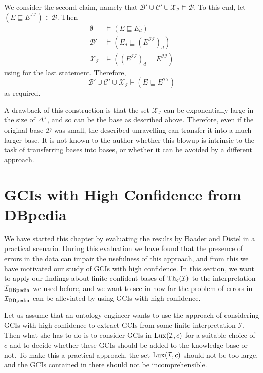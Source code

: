 \begin{Proof}
  We consider the second claim, namely that $\mathcal{B}' \cup \mathcal{C}' \cup
  \mathcal{X}_{\mathcal{I}} \models \mathcal{B}$.  To this end, let $(E \sqsubseteq
  E^{\mathcal{I}\mathcal{I}}) \in \mathcal{B}$.  Then
  \begin{align*}
    \emptyset &\models (E \sqsubseteq E_{d})\\
    \mathcal{B}' &\models (E_{d} \sqsubseteq (E^{\mathcal{I}\mathcal{I}})_{d})\\
    \mathcal{X}_{\mathcal{I}} &\models ((E^{\mathcal{I}\mathcal{I}})_{d}
    \sqsubseteq E^{\mathcal{I}\mathcal{I}})
  \end{align*}
  using  for the last statement.  Therefore,
  \begin{equation*}
    \mathcal{B}' \cup \mathcal{C}' \cup \mathcal{X}_{\mathcal{I}} \models (E \sqsubseteq
    E^{\mathcal{I}\mathcal{I}})
  \end{equation*}
  as required.
\end{Proof}

A drawback of this construction is that the set $\mathcal{X}_{\mathcal{I}}$ can be
exponentially large in the size of $\Delta^{\mathcal{I}}$, and so can be the \ELbot base
as described above.  Therefore, even if the original base $\mathcal{D}$ was small, the
described unravelling can transfer it into a much larger base.  It is not known to the
author whether this blowup is intrinsic to the task of transferring \ELgfpbot bases into
\ELbot bases, or whether it can be avoided by a different approach.

\section{GCIs with High Confidence from DBpedia}
\label{sec:exper-with-conf}

We have started this chapter by evaluating the results by Baader and Distel in a practical
scenario.  During this evaluation we have found that the presence of errors in the data
can impair the usefulness of this approach, and from this we have motivated our study of
GCIs with high confidence.  In this section, we want to apply our findings about finite
confident bases of $\operatorname{Th}_c(\mathcal{I})$ to the interpretation ${\mathcal{I}_{\text{DBpedia}}}$ we used before,
and we want to see in how far the problem of errors in ${\mathcal{I}_{\text{DBpedia}}}$ can be alleviated by
using GCIs with high confidence.

Let us assume that an ontology engineer wants to use the approach of considering GCIs with
high confidence to extract GCIs from some finite interpretation $\mathcal{I}$.  Then what
she has to do is to consider GCIs in $\operatorname{Lux}(\mathcal{I}, c)$ for a suitable choice of $c$
and to decide whether these GCIs should be added to the knowledge base or not.  To make
this a practical approach, the set $\operatorname{Lux}(\mathcal{I}, c)$ should not be too large, and the
GCIs contained in there should not be incomprehensible.

